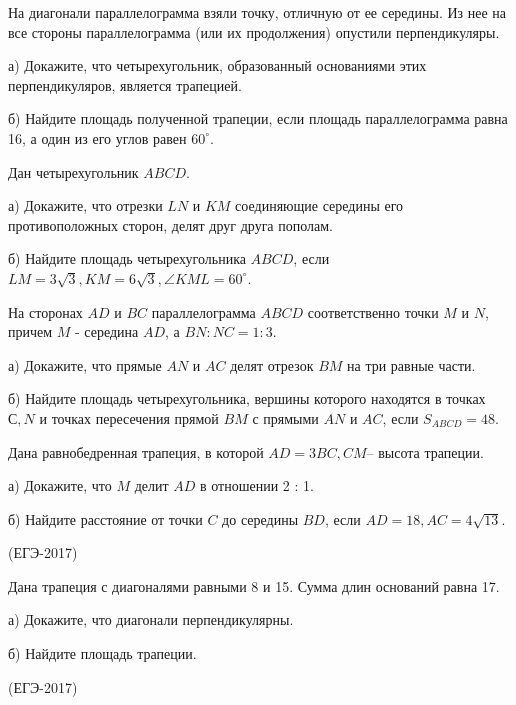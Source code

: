 \documentclass[c,12pt]{beamer}  %
\begin{document}
	\begin{frame}
		\begin{block}{}		
			На диагонали параллелограмма взяли точку, отличную от ее середины. Из нее на все стороны параллелограмма (или их продолжения) опустили перпендикуляры.
			
			а)	Докажите, что четырехугольник, образованный основаниями этих перпендикуляров, является трапецией.
			
			б)	Найдите площадь полученной трапеции, если площадь параллелограмма равна 16, а один из его углов равен $ 60^\circ $.			
		\end{block}
		\begin{block}{}
			Дан четырехугольник $ ABCD $.
			
			а)	Докажите, что отрезки $ LN $ и $ KM $ соединяющие середины его противоположных сторон, делят друг друга пополам.
			
			б)	Найдите площадь четырехугольника $ ABCD $, если $ LM = 3 \sqrt{3}, KM = 6 \sqrt{3}, \angle KML = 60^\circ$.
		\end{block}
	\end{frame}
	\begin{frame}
		\begin{block}{}
			На сторонах $ AD $ и $ BC $ параллелограмма $ ABCD  $  соответственно точки $ M $ и $ N $, причем $ M $ - середина $AD$, а $ BN : NC = 1:3 $.
			
			а)	Докажите, что прямые $ AN $ и $ AC $ делят отрезок $ BM $ на три равные части.
			
			б)	Найдите площадь четырехугольника, вершины которого находятся в точках $ С, N $ и точках пересечения прямой $ BM $ с прямыми $ AN $ и $ AC $, если  $ S_{ABCD} = 48$.
		\end{block}
	\end{frame}
	\begin{frame}
		\begin{block}{}
			Дана равнобедренная трапеция, в которой $AD = 3BC, CM$–
			высота трапеции.
			
			а) Докажите, что $M$ делит $AD$ в отношении 2 : 1.
			
			б) Найдите расстояние от точки $C$ до середины $BD$, если
			$AD = 18, AC = 4 \sqrt{13}$.
			
			(ЕГЭ-2017)
		\end{block}		
	\end{frame}

	\begin{frame}
		\begin{block}{}
			Дана трапеция с диагоналями равными 8 и 15. Сумма длин
			оснований равна 17.
			
			а) Докажите, что диагонали перпендикулярны.
			
			б) Найдите площадь трапеции.
			
			(ЕГЭ-2017)
		\end{block}
	\end{frame}
\end{document}
